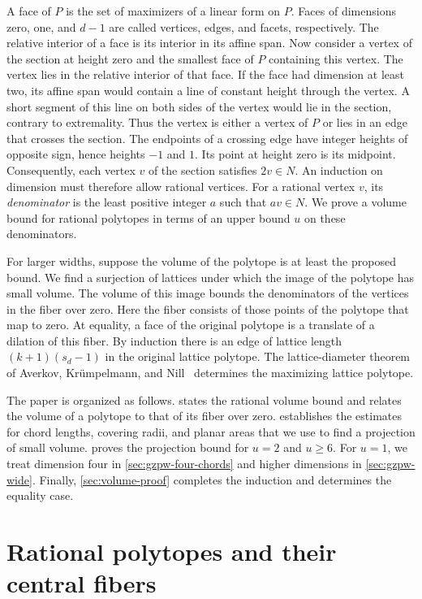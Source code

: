 \documentclass[reqno, 11pt]{article}
\numberwithin{equation}{section}
\theoremstyle{definition}
\begin{document}
A face of $P$ is the set of maximizers of a linear form on $P$.
Faces of dimensions zero, one, and $d-1$ are called vertices, edges,
and facets, respectively. The relative interior of a face is its
interior in its affine span. Now consider a vertex of the section
at height zero and the smallest face of $P$ containing this vertex.
The vertex lies in the relative interior of that face. If the face had
dimension at least two, its affine span would contain a line of
constant height through the vertex. A short segment of this line on
both sides of the vertex would lie in the section, contrary to
extremality. Thus the vertex is either a vertex of $P$ or lies in an
edge that crosses the section. The endpoints of a crossing edge have
integer heights of opposite sign, hence heights $-1$ and $1$.
Its point at height zero is its midpoint. Consequently, each vertex
$v$ of the section satisfies $2v\in N$. An induction on dimension
must therefore allow rational vertices. For a rational vertex $v$, its
\emph{denominator} is the least positive integer $a$ such that
$av\in N$. We prove a volume bound for rational polytopes in terms
of an upper bound $u$ on these denominators.

For larger widths, suppose the volume of the polytope is at least
the proposed bound. We find a surjection of lattices under which
the image of the polytope has small volume. The volume of this image
bounds the denominators of the vertices
in the fiber over zero. Here the fiber consists of those points of the
polytope that map to zero. At equality, a face of the original polytope
is a translate of a dilation of this fiber. By induction there is
an edge of lattice length $(k+1)(s_d-1)$ in the original lattice
polytope. The lattice-diameter theorem
of Averkov, Kr\"umpelmann, and Nill~\cite[Theorem~2.8]{AKN} determines
the maximizing lattice polytope.

The paper is organized as follows.  states the
rational volume bound and relates the volume of a polytope to that
of its fiber over zero.  establishes the estimates for chord
lengths, covering radii, and planar areas that we use to find a
projection of small volume.  proves the
projection bound for $u=2$ and $u\ge6$. For $u=1$, we treat dimension
four in \cref{sec:gzpw-four-chords} and higher dimensions in
\cref{sec:gzpw-wide}. Finally,
\cref{sec:volume-proof} completes the induction and determines the
equality case.

\section{Rational polytopes and their central fibers}\label{sec:reduction}
\end{document}
